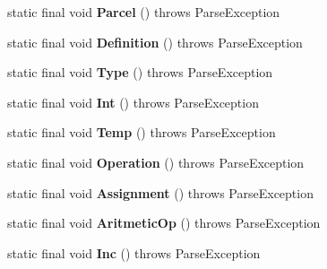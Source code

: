 \begin{DoxyCompactItemize}
\item 
static final void {\bfseries Parcel} ()  throws Parse\+Exception \hypertarget{classpack_1_1_my_new_grammar_a51f5433e7055329117d05fd721ead1f5}{}\label{classpack_1_1_my_new_grammar_a51f5433e7055329117d05fd721ead1f5}

\item 
static final void {\bfseries Definition} ()  throws Parse\+Exception \hypertarget{classpack_1_1_my_new_grammar_a9df1117cbcfc2461255ced653b0751b2}{}\label{classpack_1_1_my_new_grammar_a9df1117cbcfc2461255ced653b0751b2}

\item 
static final void {\bfseries Type} ()  throws Parse\+Exception \hypertarget{classpack_1_1_my_new_grammar_abe2bdc1256934234ee0c059d9f47ddf3}{}\label{classpack_1_1_my_new_grammar_abe2bdc1256934234ee0c059d9f47ddf3}

\item 
static final void {\bfseries Int} ()  throws Parse\+Exception \hypertarget{classpack_1_1_my_new_grammar_ab2d9d7a11c676a25283776f652323e2a}{}\label{classpack_1_1_my_new_grammar_ab2d9d7a11c676a25283776f652323e2a}

\item 
static final void {\bfseries Temp} ()  throws Parse\+Exception \hypertarget{classpack_1_1_my_new_grammar_a22ad805c4fafcb5617a5e5c7b742d181}{}\label{classpack_1_1_my_new_grammar_a22ad805c4fafcb5617a5e5c7b742d181}

\item 
static final void {\bfseries Operation} ()  throws Parse\+Exception \hypertarget{classpack_1_1_my_new_grammar_ae5bb2091d54b6559c2f5a1af5a1af4c0}{}\label{classpack_1_1_my_new_grammar_ae5bb2091d54b6559c2f5a1af5a1af4c0}

\item 
static final void {\bfseries Assignment} ()  throws Parse\+Exception \hypertarget{classpack_1_1_my_new_grammar_a2f20e3d5f103089bea13dd570fcb08fd}{}\label{classpack_1_1_my_new_grammar_a2f20e3d5f103089bea13dd570fcb08fd}

\item 
static final void {\bfseries Aritmetic\+Op} ()  throws Parse\+Exception \hypertarget{classpack_1_1_my_new_grammar_af54845ead0597af4e0678277f1d39572}{}\label{classpack_1_1_my_new_grammar_af54845ead0597af4e0678277f1d39572}

\item 
static final void {\bfseries Inc} ()  throws Parse\+Exception \hypertarget{classpack_1_1_my_new_grammar_a63d5233732118d670c6128deb442370d}{}\label{classpack_1_1_my_new_grammar_a63d5233732118d670c6128deb442370d}


\end{DoxyCompactItemize}
